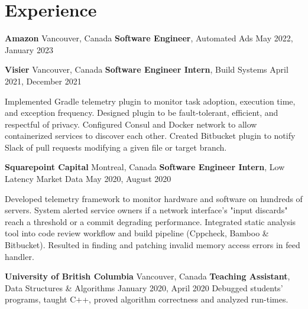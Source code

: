 \section{Experience}

\outerlist
{
    \entrybig
    {
        \textbf{Amazon}
    }
    {
        Vancouver, Canada
    }
    {
        \textbf{Software Engineer}, Automated Ads
    }
    {
        May 2022, January 2023
    }

    \entrybig
	{
	    \textbf{Visier}
    }
    {
        Vancouver, Canada
    }
	{
	    \textbf{Software Engineer Intern}, Build Systems
    }
    {
        April 2021, December 2021
    }
    
    \innerlist
    {
        \entry
        {
            Implemented Gradle telemetry plugin to monitor task adoption, execution time, and exception frequency. Designed plugin to be fault-tolerant, efficient, and respectful of privacy.
        }
        \entry
        {
            Configured Consul and Docker network to allow containerized services to discover each other.
        }
        \entry
        {
            Created Bitbucket plugin to notify Slack of pull requests modifying a given file or target branch.
        }
    }
    
    \entrybig
	{
	    \textbf{Squarepoint Capital}
    }
    {
        Montreal, Canada
    }
	{
	    \textbf{Software Engineer Intern}, Low Latency Market Data
    }
    {
        May 2020, August 2020
    }
    
    \innerlist
    {
	    \entry
        {
            Developed telemetry framework to monitor hardware and software on hundreds of servers. System alerted service owners if a network interface's "input discards" reach a threshold or a commit degrading performance.
        }
	    \entry
	    {
            Integrated static analysis tool into code review workflow and build pipeline (Cppcheck, Bamboo \& Bitbucket). Resulted in finding and patching invalid memory access errors in feed handler.
        }
    }

    \entrybig
	{
        \textbf{University of British Columbia}
    }
    {
        Vancouver, Canada
    }
	{
        \textbf{Teaching Assistant}, Data Structures \& Algorithms
    }
    {
        January 2020, April 2020
    }
    \innerlist
    {
        \entry
        {
            Debugged students’ programs, taught C++, proved algorithm correctness and analyzed run-times.
        }
    }
}
